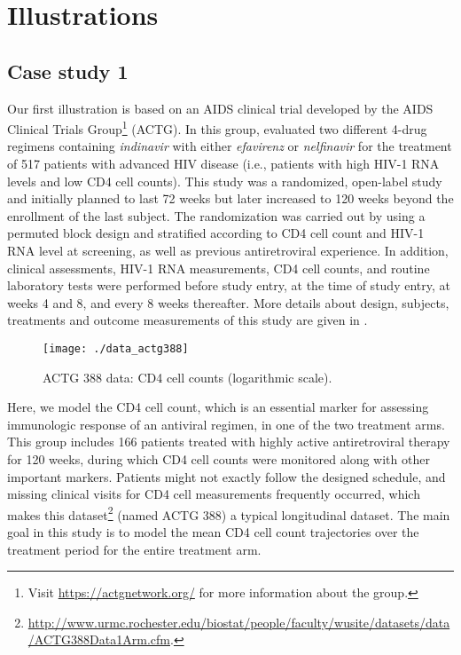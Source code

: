 \documentclass[letterpaper,10pt,openany]{article}
\begin{document}
\section{Illustrations}\label{sec_illustrations}


\subsection{Case study 1}\label{sec_case_study_1}


Our first illustration is based on an AIDS clinical trial developed by the AIDS Clinical Trials Group\footnote{Visit \url{https://actgnetwork.org/} for more information about the group.} (ACTG). In this group, \cite{fischl-03} evaluated two different 4-drug regimens containing \textit{indinavir} with either \textit{efavirenz} or \textit{nelfinavir} for the treatment of 517 patients with advanced HIV disease (i.e., patients with high HIV-1 RNA levels and low CD4 cell counts). This study was a randomized, open-label study and initially planned to last 72 weeks but later increased to 120 weeks beyond the enrollment of the last subject. The randomization was carried out by using a permuted block design and stratified according to CD4 cell count and HIV-1 RNA level at screening, as well as previous antiretroviral experience. In addition, clinical assessments, HIV-1 RNA measurements, CD4 cell counts, and routine laboratory tests were performed before study entry, at the time of study entry, at weeks 4 and 8, and every 8 weeks thereafter. More details about design, subjects, treatments and outcome measurements of this study are given in \cite{fischl-03}.


\begin{figure}[!h]
	\centering
	\texttt{[image: ./data\_actg388]}
	\caption{ACTG 388 data: CD4 cell counts (logarithmic scale).}\label{fig_spaghetti_plot_ACTG_388}
\end{figure}


Here, we model the CD4 cell count, which is an essential marker for assessing immunologic response of an antiviral regimen, in one of the two treatment arms. This group includes 166 patients treated with highly active antiretroviral therapy for 120 weeks, during which CD4 cell counts were monitored along with other important markers. Patients might not exactly follow the designed schedule, and missing clinical visits for CD4 cell measurements frequently occurred, which makes this dataset\footnote{\url{http://www.urmc.rochester.edu/biostat/people/faculty/wusite/datasets/data/ACTG388Data1Arm.cfm}.} (named ACTG 388) a typical longitudinal dataset. The main goal in this study is to model the mean CD4 cell count trajectories over the treatment period for the entire treatment arm.
\end{document}
